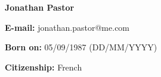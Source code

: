 \documentclass[french,11pt,a4paper]{moderncv}
\begin{document}
\makecvtitle

\vspace{-1.3cm}

\textbf{Jonathan Pastor}

\vspace{5mm} %



\textbf{E-mail:} jonathan.pastor@me.com

\textbf{Born on:} 05/09/1987 (DD/MM/YYYY)

\textbf{Citizenship:} French





\end{document}
